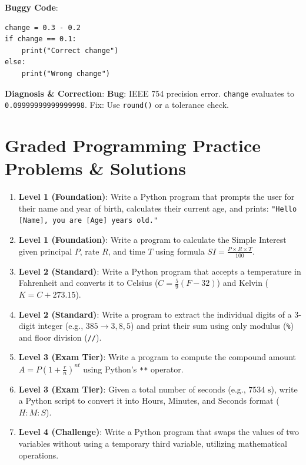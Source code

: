 \begin{debuggingbox}
\textbf{Buggy Code}:
\begin{lstlisting}[language=Python3]
change = 0.3 - 0.2
if change == 0.1:
    print("Correct change")
else:
    print("Wrong change")
\end{lstlisting}
\textbf{Diagnosis \& Correction}:
\textbf{Bug}: IEEE 754 precision error. \texttt{change} evaluates to \texttt{0.09999999999999998}. Fix: Use \texttt{round()} or a tolerance check.
\end{debuggingbox}


\section{Graded Programming Practice Problems \& Solutions}

\begin{practiceset}
\begin{enumerate}[leftmargin=1.5em]
    \item \textbf{Level 1 (Foundation)}: Write a Python program that prompts the user for their name and year of birth, calculates their current age, and prints: \texttt{"Hello [Name], you are [Age] years old."}
    \item \textbf{Level 1 (Foundation)}: Write a program to calculate the Simple Interest given principal $P$, rate $R$, and time $T$ using formula $SI = \frac{P \times R \times T}{100}$.
    \item \textbf{Level 2 (Standard)}: Write a Python program that accepts a temperature in Fahrenheit and converts it to Celsius ($C = \frac{5}{9}(F - 32)$) and Kelvin ($K = C + 273.15$).
    \item \textbf{Level 2 (Standard)}: Write a program to extract the individual digits of a 3-digit integer (e.g., $385 \to 3, 8, 5$) and print their sum using only modulus (\texttt{\%}) and floor division (\texttt{//}).
    \item \textbf{Level 3 (Exam Tier)}: Write a program to compute the compound amount $A = P(1 + \frac{r}{n})^{nt}$ using Python's \texttt{**} operator.
    \item \textbf{Level 3 (Exam Tier)}: Given a total number of seconds (e.g., $7534\text{ s}$), write a Python script to convert it into Hours, Minutes, and Seconds format ($H:M:S$).
    \item \textbf{Level 4 (Challenge)}: Write a Python program that swaps the values of two variables without using a temporary third variable, utilizing mathematical operations.
\end{enumerate}
\end{practiceset}

